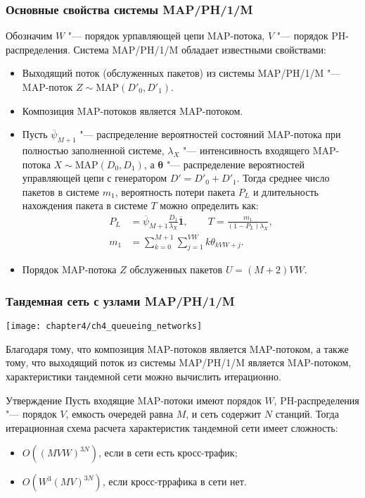 \begin{frame}
    \frametitle{Основные свойства системы MAP/PH/1/M}
    \footnotesize
    Обозначим $W$ "--- порядок урпавляющей цепи MAP-потока, $V$ "--- порядок PH-распределения.
    Система MAP/PH/1/M обладает известными свойствами:
    \begin{itemize}
        \item Выходящий поток (обслуженных пакетов) из системы MAP/PH/1/M "--- MAP-поток $Z \sim \text{MAP}(D'_0, D'_1)$.
        \item Композиция MAP-потоков является MAP-потоком.
        \item Пусть $\overline{\psi}_{M+1}$ "--- распределение вероятностей состояний MAP-потока при полностью заполненной системе, $\lambda_X$ "--- интенсивность входящего MAP-потока $X \sim \text{MAP}(D_0, D_1)$, а $\bm{\theta}$ "--- распределение вероятностей управляющей цепи с генератором $D' = D'_0 + D'_1$. Тогда среднее число пакетов в системе $m_1$, вероятность потери пакета $P_L$ и длительность нахождения пакета в системе $T$ можно определить как:
        $$
            \begin{aligned}
            P_L &= \overline{\psi}_{M+1} \frac{D_1}{\lambda_X} \overline{\bm{1}},  \qquad T = \frac{m_1}{(1 - P_L)\lambda_X},\\
            m_1 &= \sum\limits_{k=0}^{M+1} \sum_{j=1}^{VW} k\theta_{kVW+j}.
            \end{aligned}
        $$
        \item{Порядок MAP-потока $Z$ обслуженных пакетов $U = (M+2)VW$.}
    \end{itemize}
\end{frame}

\begin{frame}
    \frametitle{Тандемная сеть с узлами MAP/PH/1/M}
    \begin{center}
        \texttt{[image: chapter4/ch4\_queueing\_networks]}
    \end{center}
    \footnotesize
    Благодаря тому, что композиция MAP-потоков является MAP-потоком, а также тому, что выходящий поток из системы MAP/PH/1/M является MAP-потоком, характеристики тандемной сети можно вычислить итерационно.

    \begin{exampleblock}{Утверждение}
        Пусть входящие MAP-потоки имеют порядок $W$, PH-распределения "--- порядок $V$, емкость очередей равна $M$, и сеть содержит $N$ станций. Тогда итерационная схема расчета характеристик тандемной сети имеет сложность:
        \begin{itemize}
            \item $O((M V W)^{3N})$, если в сети есть кросс-трафик;
            \item $O(W^3 (M V)^{3N})$, если кросс-тррафика в сети нет.
        \end{itemize}
    \end{exampleblock}
\end{frame}

